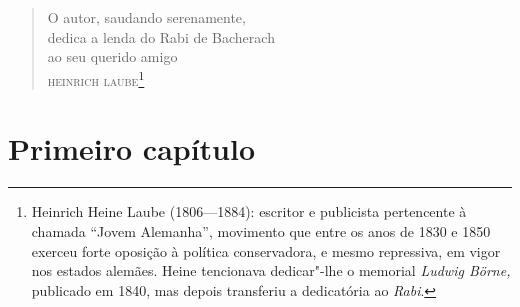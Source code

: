 

\chapter*{}
\thispagestyle{empty}

\vspace*{4cm}
\begin{verse}
O autor, saudando serenamente,\\
dedica a lenda do Rabi de Bacherach\\
ao seu querido amigo\\
\textsc{heinrich laube}\footnote{
Heinrich Heine Laube (1806---1884): escritor e publicista pertencente à
chamada ``Jovem Alemanha'', movimento que entre os anos de 1830 e 1850
exerceu forte oposição à política conservadora, e mesmo repressiva, em
vigor nos estados alemães. Heine tencionava dedicar"-lhe o memorial
\textit{Ludwig Börne, }publicado em 1840, mas depois transferiu a
dedicatória ao \textit{Rabi}.}

\end{verse}

\chapter[Primeiro capítulo]{Primeiro capítulo}


\vspace{2.5cm}

